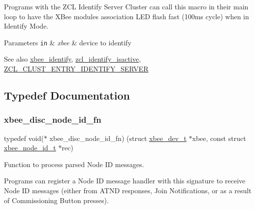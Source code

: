 Programs with the Z\+CL Identify Server Cluster can call this macro in their main loop to have the X\+Bee module\textquotesingle{}s association L\+ED flash fast (100ms cycle) when in Identify Mode. 


\begin{DoxyParams}[1]{Parameters}
\mbox{\tt in}  & {\em xbee} & device to identify\\
\hline
\end{DoxyParams}
\begin{DoxySeeAlso}{See also}
\hyperlink{group__xbee__device_ga42768d8f8aa841ed4f42396cff2815aa}{xbee\+\_\+identify}, \hyperlink{group__zcl__identify_ga95b00d55b861c1ea6033c16794ae818d}{zcl\+\_\+identify\+\_\+isactive}, \hyperlink{group__zcl__identify_gaeae5b3a460629b095247d160235ec586}{Z\+C\+L\+\_\+\+C\+L\+U\+S\+T\+\_\+\+E\+N\+T\+R\+Y\+\_\+\+I\+D\+E\+N\+T\+I\+F\+Y\+\_\+\+S\+E\+R\+V\+ER} 
\end{DoxySeeAlso}


\subsection{Typedef Documentation}
\mbox{\label{group__xbee__device_ga64bf72cf58030a080f12f8916cd7d2a2}} 
\subsubsection{\texorpdfstring{xbee\+\_\+disc\+\_\+node\+\_\+id\+\_\+fn}{xbee\_disc\_node\_id\_fn}}
{\footnotesize\ttfamily typedef void($\ast$ xbee\+\_\+disc\+\_\+node\+\_\+id\+\_\+fn) (struct \hyperlink{structxbee__dev__t}{xbee\+\_\+dev\+\_\+t} $\ast$xbee, const struct \hyperlink{structxbee__node__id__t}{xbee\+\_\+node\+\_\+id\+\_\+t} $\ast$rec)}



Function to process parsed Node ID messages. 

Programs can register a Node ID message handler with this signature to receive Node ID messages (either from A\+T\+ND responses, Join Notifications, or as a result of Commissioning Button presses).


